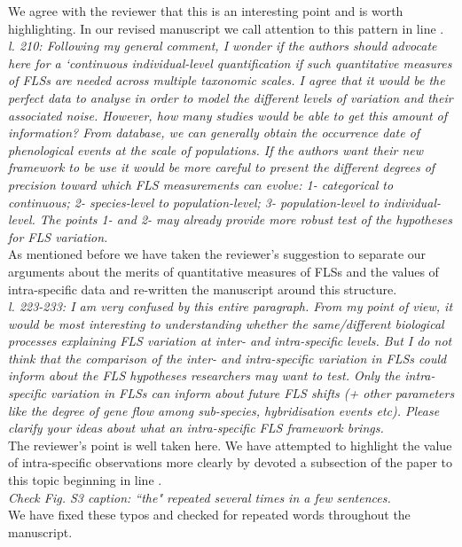 \documentclass{article}[11pt]
\begin{document}
\noident We agree with the reviewer that this is an interesting point and is worth highlighting. In our revised manuscript we call attention to this pattern in line .\\

\emph{l. 210: Following my general comment, I wonder if the authors should advocate here for a `continuous individual-level quantification if such quantitative measures of FLSs are needed across multiple taxonomic scales. I agree that it would be the perfect data to analyse in order to model the different levels of variation and their associated noise. However, how many studies would be able to get this amount of information? From database, we can generally obtain the occurrence date of phenological events at the scale of populations. If the authors want their new framework to be use it would be more careful to present the different degrees of precision toward which FLS measurements can evolve: 1- categorical to continuous; 2- species-level to population-level; 3- population-level to individual-level. The points 1- and 2- may already provide more robust test of the hypotheses for FLS variation.}\\ %

\noindent As mentioned before we have taken the reviewer's suggestion to separate our arguments about the merits of quantitative measures of FLSs and the values of intra-specific data and re-written the manuscript around this structure.\\


\emph{l. 223-233: I am very confused by this entire paragraph. From my point of view, it would be most interesting to understanding whether the same/different biological processes explaining FLS variation at inter- and intra-specific levels. But I do not think that the comparison of the inter- and intra-specific variation in FLSs could inform about the FLS hypotheses researchers may want to test. Only the intra-specific variation in FLSs can inform about future FLS shifts (+ other parameters like the degree of gene flow among sub-species, hybridisation events etc). Please clarify your ideas about what an intra-specific FLS framework brings.}\\

\noindent The reviewer's point is well taken here. We have attempted to highlight the value of intra-specific observations more clearly by devoted a subsection of the paper to this topic beginning in line .\\

\emph{Check Fig. S3 caption: ``the" repeated several times in a few sentences.}\\

\noindent We have fixed these typos and checked for repeated words throughout the manuscript.\\

\clearpage


\end{document}

